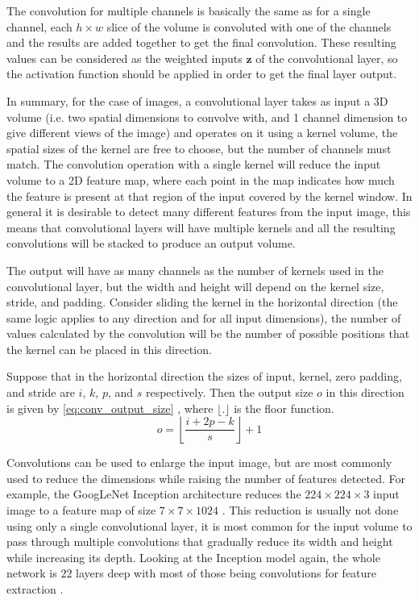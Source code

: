 The convolution for multiple channels is basically the same as for a single channel, each $h\times w$ slice of the volume is convoluted with one of the channels and the results are added together to get the final convolution. These resulting values can be considered as the weighted inputs $\bm{z}$ of the convolutional layer, so the activation function should be applied in order to get the final layer output.

In summary, for the case of images, a convolutional layer takes as input a 3D volume (i.e. two spatial dimensions to convolve with, and 1 channel dimension to give different views of the image) and operates on it using a kernel volume, the spatial sizes of the kernel are free to choose, but the number of channels must match. The convolution operation with a single kernel will reduce the input volume to a 2D feature map, where each point in the map indicates how much the feature is present at that region of the input covered by the kernel window. In general it is desirable to detect many different features from the input image, this means that convolutional layers will have multiple kernels and all the resulting convolutions will be stacked to produce an output volume.

The output will have as many channels as the number of kernels used in the convolutional layer, but the width and height will depend on the kernel size, stride, and padding. Consider sliding the kernel in the horizontal direction (the same logic applies to any direction and for all input dimensions), the number of values calculated by the convolution will be the number of possible positions that the kernel can be placed in this direction.

Suppose that in the horizontal direction the sizes of input, kernel, zero padding, and stride are $i$, $k$, $p$, and $s$ respectively. Then the output size $o$ in this direction is given by \autoref{eq:conv_output_size} \cite{guide_conv2018}, where $\lfloor{.}\rfloor$ is the floor function.
\begin{equation} \label{eq:conv_output_size}
    o = \left\lfloor{
        \frac{i + 2p - k}{s}
    }\right\rfloor + 1
\end{equation}

Convolutions can be used to enlarge the input image, but are most commonly used to reduce the dimensions while raising the number of features detected. For example, the GoogLeNet Inception architecture reduces the $224\times224\times3$ input image to a feature map of size $7\times7\times1024$ \cite{inceptionV1_2014}. This reduction is usually not done using only a single convolutional layer, it is most common for the input volume to pass through multiple convolutions that gradually reduce its width and height while increasing its depth. Looking at the Inception model again, the whole network is $22$ layers deep with most of those being convolutions for feature extraction \cite{inceptionV1_2014}.

